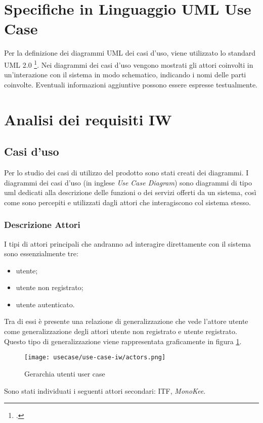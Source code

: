 \section{Specifiche in Linguaggio UML Use Case}
Per la definizione dei diagrammi UML dei casi d’uso, viene utilizzato lo standard UML 2.0 \footcite{site:uml}. Nei diagrammi dei casi d’uso vengono mostrati gli attori coinvolti in un’interazione con il sistema in modo schematico, indicando i nomi delle parti coinvolte. Eventuali informazioni aggiuntive possono essere espresse testualmente.

\section{Analisi dei requisiti IW}
\subsection{Casi d'uso}

Per lo studio dei casi di utilizzo del prodotto sono stati creati dei diagrammi.
I diagrammi dei casi d'uso (in inglese \emph{Use Case Diagram}) sono diagrammi di tipo \gls{uml} dedicati alla descrizione delle funzioni o dei servizi offerti da un sistema, così come sono percepiti e utilizzati dagli attori che interagiscono col sistema stesso.

\subsubsection{Descrizione Attori}
I tipi di attori principali che andranno ad interagire direttamente con il sistema sono essenzialmente tre: 
\begin{itemize}
    \item utente;
    \item utente non registrato;
    \item utente autenticato. 
\end{itemize}   
Tra di essi è presente una relazione di generalizzazione che vede l’attore utente come generalizzazione degli attori utente non registrato e utente registrato. Questo tipo di generalizzazione viene rappresentata graficamente in figura \ref{fig:ger-actors}.
\begin{figure}[!h]
    
    \centering
    \texttt{[image: usecase/use-case-iw/actors.png]} 
    \caption{Gerarchia utenti user case}
    \label{fig:ger-actors} 
\end{figure}
Sono stati individuati i seguenti attori secondari: ITF, \textit{MonoKee}.
